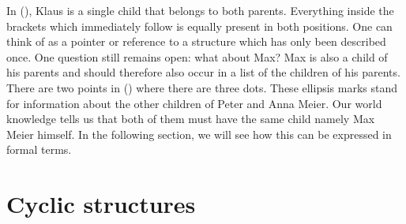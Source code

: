 In (), Klaus is a single child that belongs to both parents. Everything inside the brackets which immediately follow  is equally present in both
positions. One can think of  as a pointer or reference to a structure which has only been described once. One question still remains open: what about Max?
Max is also a child of his parents and should therefore also occur in a list of the children of his parents. There are two points in () where there are three
dots. These ellipsis marks stand for information about the other children of Peter and Anna
Meier. Our world knowledge tells us that both of them must have the same child namely Max Meier himself. In the following section, we will see how this can be expressed in formal terms.%

\section{Cyclic structures}

